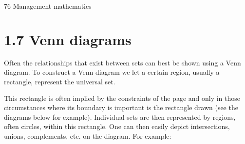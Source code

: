 76 Management mathematics

\section{1.7 Venn diagrams}
Often the relationships that exist between sets can best be shown using a
Venn diagram. To construct a Venn diagram we let a certain region, usually
a rectangle, represent the universal set. 

This rectangle is often implied
by the constraints of the page and only in those circumstances where its
boundary is important is the rectangle drawn (see the diagrams below for
example). Individual sets are then represented by regions, often circles,
within this rectangle. One can then easily depict intersections, unions,
complements, etc. on the diagram. For example:
